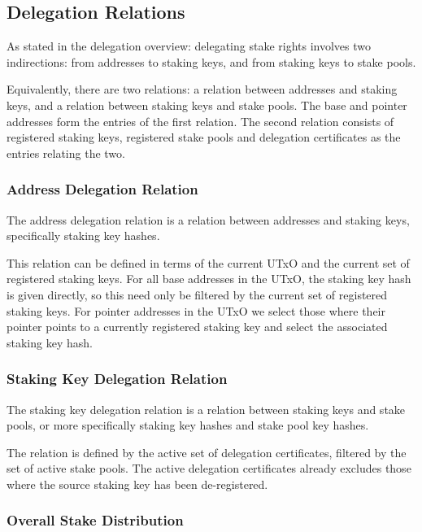 \documentclass[11pt,a4paper,dvipsnames,twosided]{article}
\begin{document}
\subsection{Delegation Relations}
\label{delegation-relations}

As stated in the delegation overview: delegating stake rights involves
two indirections: from addresses to staking keys, and from staking keys to
stake pools.

Equivalently, there are two relations: a relation between addresses and
staking keys, and a relation between staking keys and stake pools. The base
and pointer addresses form the entries of the first relation. The second
relation consists of registered staking keys, registered stake pools and
delegation certificates as the entries relating the two.

\subsubsection{Address Delegation Relation}
\label{address-delegation-relation}

The address delegation relation is a relation between addresses and
staking keys, specifically staking key hashes.

This relation can be defined in terms of the current UTxO and the
current set of registered staking keys. For all base addresses in the
UTxO, the staking key hash is given directly, so this need only be
filtered by the current set of registered staking keys. For pointer
addresses in the UTxO we select those where their pointer points to a
currently registered staking key and select the associated staking key hash.

\subsubsection{Staking Key Delegation Relation}
\label{stake-key-delegation-relation}

The staking key delegation relation is a relation between staking keys and
stake pools, or more specifically staking key hashes and stake pool key
hashes.

The relation is defined by the active set of delegation certificates,
filtered by the set of active stake pools. The active delegation
certificates already excludes those where the source staking key has
been de-registered.

\subsubsection{Overall Stake Distribution}
\label{overall-stake-distribution}
\end{document}
